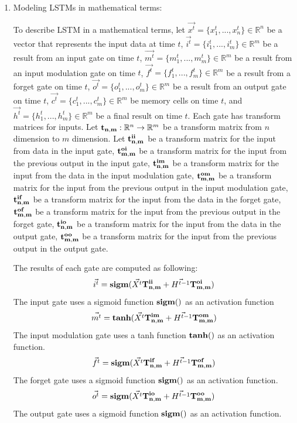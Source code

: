\documentclass[draft,dvipsnames]{drexel-thesis}
\begin{document}
\begin{thesis}
\begin{enumerate}

\item Modeling LSTMs in mathematical terms:

	To describe LSTM in a mathematical terms, let $\vec{x^t} = \{ x_1^t, ..., x_n^t\} \in \mathbb{R}^n$ be a vector that represents the input data at time $t$, $\vec{i^t} = \{i_1^t, ..., i_m^t\} \in \mathbb{R}^m$ be a result from an input gate on time $t$, $\vec{m^t} = \{m_1^t, ..., m_m^t\} \in \mathbb{R}^m$ be a result from an input modulation gate on time $t$, $\vec{f^t} = \{f_1^t, ..., f_m^t\} \in \mathbb{R}^m$ be a result from a forget gate on time $t$, $\vec{o^t} = \{o_1^t, ..., o_m^t\} \in \mathbb{R}^m$ be a result from an output gate on time $t$, $\vec{c^t} = \{c_1^t, ..., c_m^t\} \in \mathbb{R}^m$ be memory cells on time $t$, and $\vec{h^t} = \{h_1^t, ..., h_m^t\} \in \mathbb{R}^m$ be a final result on time $t$.
Each gate has transform matrices for inputs. Let $\bold{t_{n,m}}: \mathbb{R}^n \rightarrow \mathbb{R}^m$ be a transform matrix from $n$ dimension to $m$ dimension. Let $\bold{t_{n,m}^{ii}}$ be a transform matrix for the input from data in the input gate, $\bold{t_{m,m}^{oi}}$ be a transform matrix for the input from the previous output in the input gate, $\bold{t_{n,m}^{im}}$ be a transform matrix for the input from the data in the input modulation gate, $\bold{t_{m,m}^{om}}$ be a transform matrix for the input from the previous output in the input modulation gate, $\bold{t_{n,m}^{if}}$ be a transform matrix for the input from the data in the forget gate, $\bold{t_{m,m}^{of}}$ be a transform matrix for the input from the previous output in the forget gate, $\bold{t_{n,m}^{io}}$ be a transform matrix for the input from the data in the output gate, $\bold{t_{m,m}^{oo}}$ be a transform matrix for the input from the previous output in the output gate.

	The results of each gate are computed as following:
	$$\vec{i^t} = \bold{sigm}(\vec{X^t}\bold{T_{n,m}^{ii}} + \vec{H^{t-1}}\bold{T_{m,m}^{oi}})$$
	The input gate uses a sigmoid function $\bold{sigm()}$ as an activation function
	$$\vec{m^t} = \bold{tanh}(\vec{X^t}\bold{T_{n,m}^{im}} + \vec{H^{t-1}}\bold{T_{m,m}^{om}})$$
	The input modulation gate uses a tanh function $\bold{tanh()}$ as an activation function.
	$$\vec{f^t} = \bold{sigm}(\vec{X^t}\bold{T_{n,m}^{if}} + \vec{H^{t-1}}\bold{T_{m,m}^{of}})$$
	The forget gate uses a sigmoid function $\bold{sigm()}$ as an activation function.
	$$\vec{o^t} = \bold{sigm}(\vec{X^t}\bold{T_{n,m}^{io}} + \vec{H^{t-1}}\bold{T_{m,m}^{oo}})$$
	The output gate uses a sigmoid function $\bold{sigm()}$ as an activation function.


\end{enumerate}
\end{thesis}
\end{document}
